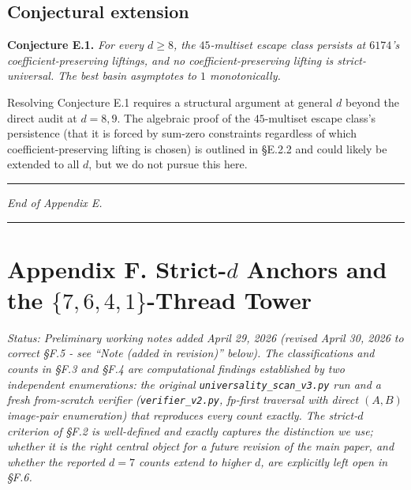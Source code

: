\documentclass[11pt,letterpaper]{article}
\theoremstyle{paperstyle}
\theoremstyle{paperstyledef}
\theoremstyle{paperstylerem}
\begin{document}
\hypertarget{e.4-conjectural-extension}{%
\subsection{Conjectural extension}\label{e.4-conjectural-extension}}

\textbf{Conjecture E.1.} \emph{For every \(d \geq 8\), the
\(45\)-multiset escape class persists at \(6174\)'s
coefficient-preserving liftings, and no coefficient-preserving lifting
is strict-universal. The best basin asymptotes to \(1\) monotonically.}

Resolving Conjecture E.1 requires a structural argument at general \(d\)
beyond the direct audit at \(d = 8, 9\). The algebraic proof of the
\(45\)-multiset escape class's persistence (that it is forced by
sum-zero constraints regardless of which coefficient-preserving lifting
is chosen) is outlined in §E.2.2 and could likely be extended to all
\(d\), but we do not pursue this here.

\begin{center}\rule{0.5\linewidth}{0.5pt}\end{center}

\emph{End of Appendix E.}

\begin{center}\rule{0.5\linewidth}{0.5pt}\end{center}

\hypertarget{appendix-f.-strict-d-anchors-and-the-7-6-4-1-thread-tower}{%
\section{\texorpdfstring{Appendix F. Strict-\(d\) Anchors and the
\(\{7, 6, 4, 1\}\)-Thread
Tower}{Appendix F. Strict-d Anchors and the \textbackslash\{7, 6, 4, 1\textbackslash\}-Thread Tower}}\label{appendix-f.-strict-d-anchors-and-the-7-6-4-1-thread-tower}}

\emph{Status: Preliminary working notes added April 29, 2026 (revised
April 30, 2026 to correct §F.5 - see ``Note (added in revision)''
below). The classifications and counts in §F.3 and §F.4 are
computational findings established by two independent enumerations: the
original \texttt{universality\_scan\_v3.py} run and a fresh from-scratch
verifier (\texttt{verifier\_v2.py}, fp-first traversal with direct
\((A, B)\) image-pair enumeration) that reproduces every count exactly.
The strict-\(d\) criterion of §F.2 is well-defined and exactly captures
the distinction we use; whether it is the right central object for a
future revision of the main paper, and whether the reported \(d = 7\)
counts extend to higher \(d\), are explicitly left open in §F.6.}
\end{document}
